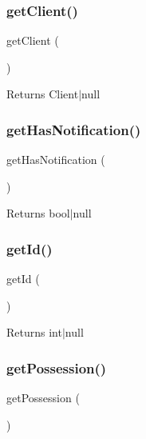 \subsubsection{\texorpdfstring{getClient()}{getClient()}}
{\footnotesize\ttfamily get\+Client (\begin{DoxyParamCaption}{ }\end{DoxyParamCaption})}

\begin{DoxyReturn}{Returns}
Client$\vert$null 
\end{DoxyReturn}
\mbox{\label{class_app_1_1_entity_1_1_favorite_ae3e9c50913a049d374722d524d87b506}} 
\subsubsection{\texorpdfstring{getHasNotification()}{getHasNotification()}}
{\footnotesize\ttfamily get\+Has\+Notification (\begin{DoxyParamCaption}{ }\end{DoxyParamCaption})}

\begin{DoxyReturn}{Returns}
bool$\vert$null 
\end{DoxyReturn}
\mbox{\label{class_app_1_1_entity_1_1_favorite_a12251d0c022e9e21c137a105ff683f13}} 
\subsubsection{\texorpdfstring{getId()}{getId()}}
{\footnotesize\ttfamily get\+Id (\begin{DoxyParamCaption}{ }\end{DoxyParamCaption})}

\begin{DoxyReturn}{Returns}
int$\vert$null 
\end{DoxyReturn}
\mbox{\label{class_app_1_1_entity_1_1_favorite_a4ad5c74255a75f0d61664cba32657af7}} 
\subsubsection{\texorpdfstring{getPossession()}{getPossession()}}
{\footnotesize\ttfamily get\+Possession (\begin{DoxyParamCaption}{ }\end{DoxyParamCaption})}

